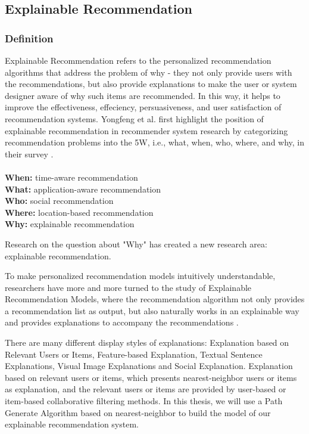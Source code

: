 \subsection{Explainable Recommendation}
\subsubsection{Definition}
Explainable Recommendation refers to the personalized recommendation algorithms that address the problem of why - they not only provide users with the recommendations, but also provide explanations to make the user or system designer aware of why such items are recommended. In this way, it helps to improve the effectiveness, effeciency, persuasiveness, and user satisfaction of recommendation systems. Yongfeng et al. first highlight the position of explainable recommendation in recommender system research by categorizing recommendation problems into the 5W, i.e., what, when, who, where, and why, in their survey \cite{zhang2018explainable}. 
\\
\\
\textbf{When:} time-aware recommendation \\
\textbf{What:} application-aware recommendation \\
\textbf{Who:} social recommendation \\
\textbf{Where:} location-based recommendation \\
\textbf{Why:} explainable recommendation \\
\par Research on the question about "Why" has created a new research area: explainable recommendation.
\par To make personalized recommendation models intuitively understandable, researchers have more and more turned to the study of Explainable Recommendation Models, where the recommendation algorithm not only provides a recommendation list as output, but also naturally works in an explainable way and provides explanations to accompany the recommendations \cite{mcauley2015image}.
\par There are many different display styles of explanations: Explanation based on Relevant Users or Items, Feature-based Explanation, Textual Sentence Explanations, Visual Image Explanations and Social Explanation. Explanation based on relevant users or items, which presents nearest-neighbor users or items as explanation, and the relevant users or items are provided by user-based or item-based collaborative filtering methods. In this thesis, we will use a Path Generate Algorithm based on nearest-neighbor to build the model of our explainable recommendation system.
